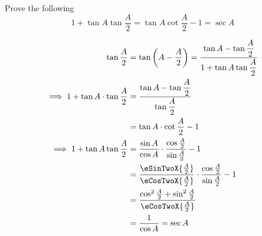 

\question[4] Prove the following  
\[ 1+\tan A\tan \dfrac{A}{2} = \tan A\cot\dfrac{A}{2} - 1 = \sec A \]

\begin{solution}[\fullpage]
   \begin{align}
      \tan\dfrac{A}{2} &= \tan\left( A - \dfrac{A}{2}\right) = \dfrac{\tan A - \tan\dfrac{A}{2}}{1 + \tan A\tan\dfrac{A}{2}} \\
       \implies 1 + \tan A\cdot\tan\dfrac{A}{2} &= \dfrac{\tan A-\tan\dfrac{A}{2}}{\tan\dfrac{A}{2}} \\
         &= \tan A\cdot\cot\dfrac{A}{2} - 1 \\
      \implies 1 + \tan A\tan\dfrac{A}{2} &= 
      \dfrac{\sin A}{\cos A}\cdot\dfrac{\cos\frac{A}{2}}{\sin\frac{A}{2}} - 1 \\
      &= \dfrac{\eSinTwoX{\frac{A}{2}}}{\eCosTwoX{\frac{A}{2}}}\cdot
      \dfrac{\cos\frac{A}{2}}{\sin\frac{A}{2}} - 1 \\
      &= \dfrac{\cos^2 \frac{A}{2} + \sin^2 \frac{A}{2}}{\eCosTwoX{\frac{A}{2}}} \\
      &= \dfrac{1}{\cos A} = \sec A
   \end{align}
\end{solution}
